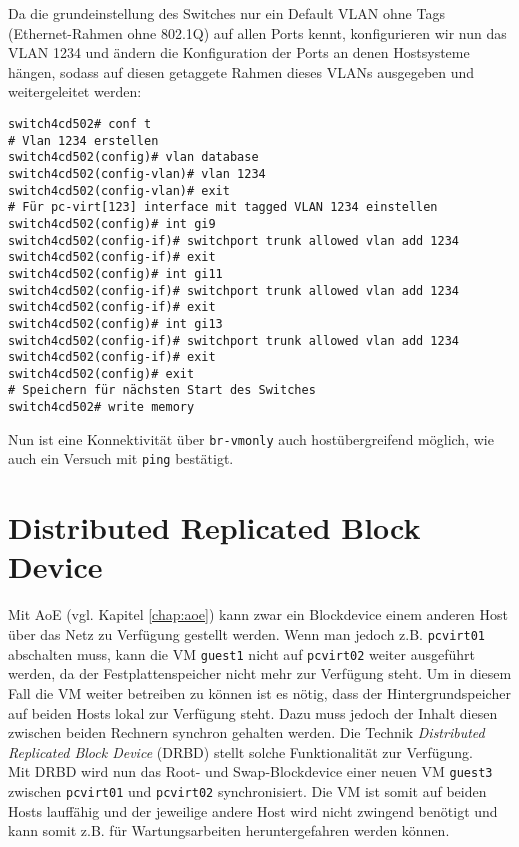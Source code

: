 Da die grundeinstellung des Switches nur ein Default VLAN ohne Tags (Ethernet-Rahmen ohne 802.1Q) auf allen Ports kennt, konfigurieren wir nun das VLAN 1234 und ändern die Konfiguration der Ports an denen Hostsysteme hängen, sodass auf diesen getaggete Rahmen dieses VLANs ausgegeben und weitergeleitet werden:
\setupVerbatimOut
\begin{verbatim}
switch4cd502# conf t
# Vlan 1234 erstellen
switch4cd502(config)# vlan database 
switch4cd502(config-vlan)# vlan 1234
switch4cd502(config-vlan)# exit
# Für pc-virt[123] interface mit tagged VLAN 1234 einstellen 
switch4cd502(config)# int gi9 
switch4cd502(config-if)# switchport trunk allowed vlan add 1234
switch4cd502(config-if)# exit
switch4cd502(config)# int gi11
switch4cd502(config-if)# switchport trunk allowed vlan add 1234
switch4cd502(config-if)# exit
switch4cd502(config)# int gi13
switch4cd502(config-if)# switchport trunk allowed vlan add 1234
switch4cd502(config-if)# exit
switch4cd502(config)# exit
# Speichern für nächsten Start des Switches
switch4cd502# write memory
\end{verbatim}

Nun ist eine Konnektivität über \verb#br-vmonly# auch hostübergreifend möglich, wie auch ein Versuch mit \verb#ping# bestätigt. 

\chapter{Distributed Replicated Block Device}\label{chap:drbd}

Mit AoE (vgl. Kapitel \ref{chap:aoe}) kann zwar ein Blockdevice einem anderen Host über das Netz zu Verfügung gestellt werden. Wenn man jedoch z.B. \verb#pcvirt01# abschalten muss, kann die VM \verb#guest1# nicht auf \verb#pcvirt02# weiter ausgeführt werden, da der Festplattenspeicher nicht mehr zur Verfügung steht. Um in diesem Fall die VM weiter betreiben zu können ist es nötig, dass der Hintergrundspeicher auf beiden Hosts lokal zur Verfügung steht. Dazu muss jedoch der Inhalt diesen zwischen beiden Rechnern synchron gehalten werden. Die Technik \emph{Distributed Replicated Block Device} (DRBD) stellt solche Funktionalität zur Verfügung. 
\\
Mit DRBD wird nun das Root- und Swap-Blockdevice einer neuen VM \verb#guest3# zwischen \verb#pcvirt01# und \verb#pcvirt02# synchronisiert. Die VM ist somit auf beiden Hosts lauffähig und der jeweilige andere Host wird nicht zwingend benötigt und kann somit z.B. für Wartungsarbeiten heruntergefahren werden können. 

